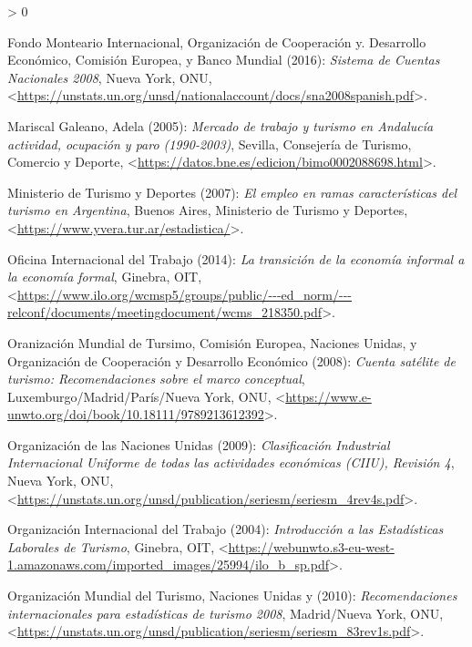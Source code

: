 \documentclass[
  openany]{book}
\newlength{\cslhangindent}
\newenvironment{CSLReferences}[2] %
 {%
  \setlength{\parindent}{0pt}
  \ifodd #1 \everypar{\setlength{\hangindent}{\cslhangindent}}\ignorespaces\fi
  \ifnum #2 > 0
  \setlength{\parskip}{#2\baselineskip}
  \fi
 }%
 {}
\begin{document}
\hypertarget{refs}{}
\begin{CSLReferences}{1}{0}
\leavevmode\hypertarget{ref-scn2008}{}%
Fondo Monteario Internacional, Organización de Cooperación y. Desarrollo Económico, Comisión Europea, y Banco Mundial (2016): \emph{Sistema de Cuentas Nacionales 2008}, Nueva York, ONU, \textless{}\url{https://unstats.un.org/unsd/nationalaccount/docs/sna2008spanish.pdf}\textgreater.

\leavevmode\hypertarget{ref-mariscal2005}{}%
Mariscal Galeano, Adela (2005): \emph{Mercado de trabajo y turismo en Andalucía actividad, ocupación y paro (1990-2003)}, Sevilla, Consejería de Turismo, Comercio y Deporte, \textless{}\url{https://datos.bne.es/edicion/bimo0002088698.html}\textgreater.

\leavevmode\hypertarget{ref-mintur2007}{}%
Ministerio de Turismo y Deportes (2007): \emph{El empleo en ramas características del turismo en Argentina}, Buenos Aires, Ministerio de Turismo y Deportes, \textless{}\url{https://www.yvera.tur.ar/estadistica/}\textgreater.

\leavevmode\hypertarget{ref-oitconferencia14}{}%
Oficina Internacional del Trabajo (2014): \emph{La transición de la economía informal a la economía formal}, Ginebra, OIT, \textless{}\url{https://www.ilo.org/wcmsp5/groups/public/---ed_norm/---relconf/documents/meetingdocument/wcms_218350.pdf}\textgreater.

\leavevmode\hypertarget{ref-cstrmc2008}{}%
Oranización Mundial de Tursimo, Comisión Europea, Naciones Unidas, y Organización de Cooperación y Desarrollo Económico (2008): \emph{Cuenta satélite de turismo: Recomendaciones sobre el marco conceptual}, Luxemburgo/Madrid/París/Nueva York, ONU, \textless{}\url{https://www.e-unwto.org/doi/book/10.18111/9789213612392}\textgreater.

\leavevmode\hypertarget{ref-ciiurev4}{}%
Organización de las Naciones Unidas (2009): \emph{Clasificación Industrial Internacional Uniforme de todas las actividades económicas (CIIU), Revisión 4}, Nueva York, ONU, \textless{}\url{https://unstats.un.org/unsd/publication/seriesm/seriesm_4rev4s.pdf}\textgreater.

\leavevmode\hypertarget{ref-oit2004}{}%
Organización Internacional del Trabajo (2004): \emph{Introducción a las Estadísticas Laborales de Turismo}, Ginebra, OIT, \textless{}\url{https://webunwto.s3-eu-west-1.amazonaws.com/imported_images/25994/ilo_b_sp.pdf}\textgreater.

\leavevmode\hypertarget{ref-riet2008}{}%
Organización Mundial del Turismo, Naciones Unidas y (2010): \emph{Recomendaciones internacionales para estadísticas de turismo 2008}, Madrid/Nueva York, ONU, \textless{}\url{https://unstats.un.org/unsd/publication/seriesm/seriesm_83rev1s.pdf}\textgreater.

\end{CSLReferences}
\end{document}
